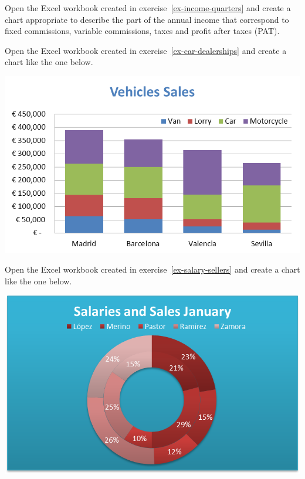 \item Open the Excel workbook created in exercise~\ref{ex-income-quarters} and create a chart appropriate to describe
the part of the annual income that correspond to fixed commissions, variable commissions, taxes and profit after taxes
(PAT).

\item Open the Excel workbook created in exercise~\ref{ex-car-dealerships} and create a chart like the one below.
\begin{center}
\includegraphics[scale=0.8]{img/car-dealerships}
\end{center}

\item Open the Excel workbook created in exercise~\ref{ex-salary-sellers} and create a chart like the one below.
\begin{center}
\includegraphics[scale=0.8]{img/salary-sellers}
\end{center}

